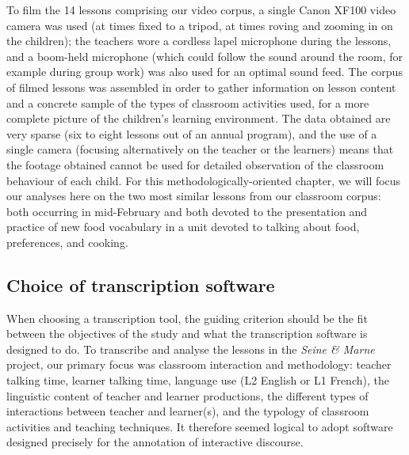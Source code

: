 \documentclass[output=paper,colorlinks,citecolor=brown,modfonts,nonflat]{../langscibook}
\begin{document}
To film the 14 lessons comprising our video corpus, a single Canon XF100 video camera was used (at times fixed to a tripod, at times roving and zooming in on the children); the teachers wore a cordless lapel microphone during the lessons, and a boom-held microphone (which could follow the sound around the room, for example during group work) was also used for an optimal sound feed. The corpus of filmed lessons was assembled in order to gather information on lesson content and a concrete sample of the types of classroom activities used, for a more complete picture of the children’s learning environment. The data obtained are very sparse (six to eight lessons out of an annual program), and the use of a single camera (focusing alternatively on the teacher or the learners) means that the footage obtained cannot be used for detailed observation of the classroom behaviour of each child. For this methodologically-oriented chapter, we will focus our analyses here on the two most similar lessons from our classroom corpus: both occurring in mid-February and both devoted to the presentation and practice of new food vocabulary in a unit devoted to talking about food, preferences, and cooking.

\subsection{{Choice of transcription software}\label{sec:hilton:3.3}}

When choosing a transcription tool, the guiding criterion should be the fit between the objectives of the study and what the transcription software is designed to do. To transcribe and analyse the lessons in the \textit{Seine \&  Marne} project, our primary focus was classroom interaction and methodology: teacher talking time, learner talking time, language use (L2 English or L1 French), the linguistic content of teacher and learner productions, the different types of interactions between teacher and learner(s), and the typology of classroom activities and teaching techniques. It therefore seemed logical to adopt software designed precisely for the annotation of interactive discourse. 
\end{document}
